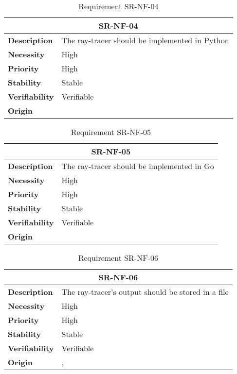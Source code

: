 \begin{table}[H]
    \centering
    \begin{tabular}{l p{10cm}}
        \toprule
        \multicolumn{2}{c}{SR-NF-04} \\
        \toprule
        \textbf{Description}        & The ray-tracer should be implemented in Python \\
        \textbf{Necessity}          &  High \\
        \textbf{Priority}           &  High \\
        \textbf{Stability}          &  Stable \\
        \textbf{Verifiability}      & Verifiable \\
        \textbf{Origin}             &  \textit{\nameref{tab:ur-re-01}} \\
    \end{tabular}
    \caption{Requirement SR-NF-04}
    \label{tab:sr-nf-04}
\end{table}

\begin{table}[H]
    \centering
    \begin{tabular}{l p{10cm}}
        \toprule
        \multicolumn{2}{c}{SR-NF-05} \\
        \toprule
        \textbf{Description}        & The ray-tracer should be implemented in Go \\
        \textbf{Necessity}          &  High \\
        \textbf{Priority}           &  High \\
        \textbf{Stability}          &  Stable \\
        \textbf{Verifiability}      & Verifiable \\
        \textbf{Origin}             &  \textit{\nameref{tab:ur-re-01}} \\
    \end{tabular}
    \caption{Requirement SR-NF-05}
    \label{tab:sr-nf-05}
\end{table}

\begin{table}[H]
    \centering
    \begin{tabular}{l p{10cm}}
        \toprule
        \multicolumn{2}{c}{SR-NF-06} \\
        \toprule
        \textbf{Description}        & The ray-tracer's output should be stored in a file \\
        \textbf{Necessity}          &  High \\
        \textbf{Priority}           &  High \\
        \textbf{Stability}          &  Stable \\
        \textbf{Verifiability}      & Verifiable \\
        \textbf{Origin}             &  \textit{\nameref{tab:ur-ca-04}}, \textit{\nameref{tab:ur-ca-14}} \\
    \end{tabular}
    \caption{Requirement SR-NF-06}
    \label{tab:sr-nf-06}
\end{table}


